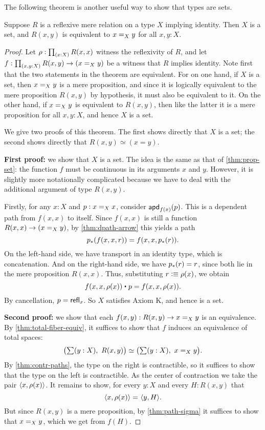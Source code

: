 The following theorem is another useful way to show that types are sets.

\begin{thm}\label{thm:h-set-refrel-in-paths-sets}
  Suppose $R$ is a reflexive mere relation on a type $X$ implying identity.
  Then $X$ is a set, and $R(x,y)$ is equivalent to $\id[X]{x}{y}$ for all $x,y:X$.
\end{thm}

\begin{proof}
  Let $\rho : \prd{x:X} R(x,x)$ witness the reflexivity of $R$, and let $f : \prd{x,y:X} R(x,y) \to (\id[X]{x}{y})$ be a witness that $R$
implies identity.
  Note first that the two statements in the theorem are equivalent.
  For on one hand, if $X$ is a set, then $\id[X]xy$ is a mere proposition, and since it is logically equivalent to the mere proposition
$R(x,y)$ by hypothesis, it must also be equivalent to it.
  On the other hand, if $\id[X]xy$ is equivalent to $R(x,y)$, then like the latter it is a mere proposition for all $x,y:X$, and hence $X$
is a set.

  We give two proofs of this theorem.
  The first shows directly that $X$ is a set; the second shows directly that $R(x,y)\simeq (x=y)$.

  \textbf{First proof:} we show that $X$ is a set.
  The idea is the same as that of \autoref{thm:prop-set}: the function $f$ must be continuous in its arguments $x$ and $y$.
  However, it is slightly more notationally complicated because we have to deal with the additional argument of type $R(x,y)$.

  Firstly, for any $x:X$ and $p:\id[X]xx$, consider $\apdfunc{f(x)}(p)$.
  This is a dependent path from $f(x,x)$ to itself.
  Since $f(x,x)$ is still a function $R(x,x) \to (\id[X]xy)$, by \autoref{thm:dpath-arrow} this yields a path
  \[\trans{p}{f(x,x,r)} = f(x,x,\trans{p}r).
  \]
  On the left-hand side, we have transport in an identity type, which is concatenation.
  And on the right-hand side, we have $\trans{p}r = r$, since both lie in the mere proposition $R(x,x)$.
  Thus, substituting $r\defeq \rho(x)$, we obtain
  \[ f(x,x,\rho(x)) \ct p = f(x,x,\rho(x)). \]
  By cancellation, $p=\refl{x}$.
  So $X$ satisfies Axiom K, and hence is a set.

  \textbf{Second proof:} we show that each $f(x,y) : R(x,y) \to \id[X]{x}{y}$ is an equivalence.
  By \autoref{thm:total-fiber-equiv}, it suffices to show that $f$ induces an equivalence of total spaces:
  \begin{equation*}
    \eqv{\big(\sm{y:X}R(x,y)\big)}{\big(\sm{y:X}\id[X]{x}{y}\big)}.
  \end{equation*}
  By \autoref{thm:contr-paths}, the type on the right is contractible, so it
  suffices to show that the type on the left is contractible. As the center of
  contraction we take the pair $\pairr{x,\rho(x)}$.  It remains to show, for
  every ${y:X}$ and every ${H:R(x,y)}$ that
  \begin{equation*}
    \id{\pairr{x,\rho(x)}}{\pairr{y,H}}.
  \end{equation*}
  But since $R(x,y)$ is a mere proposition, by \autoref{thm:path-sigma} it suffices to show that
  $\id[X]{x}{y}$, which we get from $f(H)$.
\end{proof}

